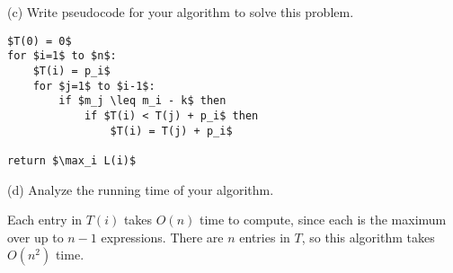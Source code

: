 \documentclass[12pt]{amsart}
\theoremstyle{plain}
\theoremstyle{definition}
\theoremstyle{remark}
\begin{document}
	(c) Write pseudocode for your algorithm to solve this problem.
	
	\begin{tcolorbox}
		\begin{lstlisting}[tabsize=4]
$T(0) = 0$
for $i=1$ to $n$:
	$T(i) = p_i$
	for $j=1$ to $i-1$:
		if $m_j \leq m_i - k$ then
			if $T(i) < T(j) + p_i$ then
				$T(i) = T(j) + p_i$

return $\max_i L(i)$
		\end{lstlisting}
	\end{tcolorbox}
	
	(d) Analyze the running time of your algorithm.
	
	\begin{tcolorbox}
		Each entry in $T(i)$ takes $O(n)$ time to compute, since each is the maximum over up to $n-1$ expressions.  There are $n$ entries in $T$, so this algorithm takes $O(n^2)$ time.
	\end{tcolorbox}
	
\end{document}
